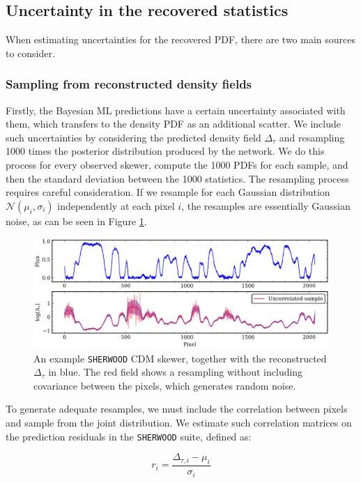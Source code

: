 \subsection{Uncertainty in the recovered statistics}
When estimating uncertainties for the recovered PDF, there are two main sources to consider.

\subsubsection{Sampling from reconstructed density fields}
Firstly, the Bayesian ML predictions have a certain uncertainty associated with them, which transfers to the density PDF as an additional scatter. We include such uncertainties by considering the predicted density field $\Delta_\tau$ and resampling 1000 times the posterior distribution produced by the network. We do this process for every observed skewer, compute the 1000 PDFs for each sample, and then the standard deviation between the 1000 statistics. The resampling process requires careful consideration. If we resample for each Gaussian distribution $\mathcal{N}(\mu_i,\sigma_i)$ independently at each pixel $i$, the resamples are essentially Gaussian noise, as can be seen in Figure \ref{fig: resampling indep}.



\begin{figure}
    \centering
    \includegraphics[width=0.85\linewidth]{img/ML/ml_resample_no_covariance.png}
    \caption{An example \texttt{SHERWOOD} CDM skewer, together with the reconstructed $\Delta_\tau$ in blue. The red field shows a resampling without including covariance between the pixels, which generates random noise.}
    \label{fig: resampling indep}
\end{figure}

To generate adequate resamples, we must include the correlation between pixels and sample from the joint distribution. We estimate such correlation matrices on the prediction residuals in the \texttt{SHERWOOD} suite, defined as:

\begin{equation}\label{eq: residuals}
    r_i=\frac{\Delta_{\tau,i}-\mu_i}{\sigma_i}
\end{equation}

